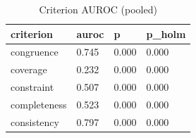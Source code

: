 \begin{table}[t]
\centering
\small
\begin{tabular}{llll}
\hline
criterion & auroc & p & p\_holm \\
\hline
congruence & 0.745 & 0.000 & 0.000 \\
coverage & 0.232 & 0.000 & 0.000 \\
constraint & 0.507 & 0.000 & 0.000 \\
completeness & 0.523 & 0.000 & 0.000 \\
consistency & 0.797 & 0.000 & 0.000 \\
\hline
\end{tabular}
\caption{Criterion AUROC (pooled)}
\label{tab:criteria}
\end{table}
